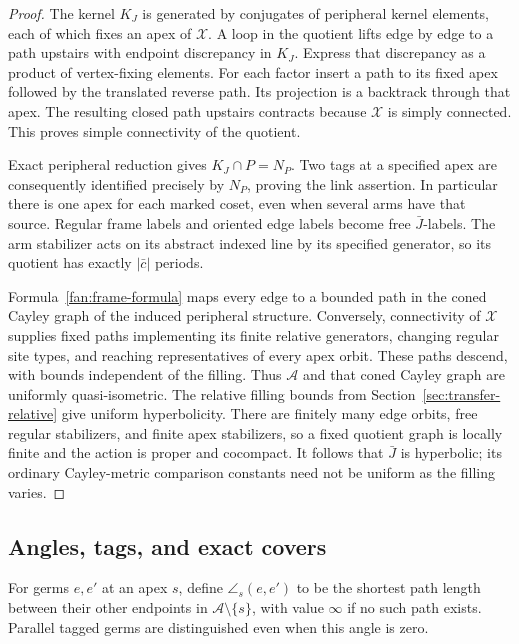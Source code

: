 \begin{proof}
The kernel $K_J$ is generated by conjugates of peripheral kernel
elements, each of which fixes an apex of $\mathcal X$.  A loop in the
quotient lifts edge by edge to a path upstairs with endpoint discrepancy
in $K_J$.  Express that discrepancy as a product of vertex-fixing
elements.  For each factor insert a path to its fixed apex followed by
the translated reverse path.  Its projection is a backtrack through
that apex.  The resulting closed path upstairs contracts because
$\mathcal X$ is simply connected.  This proves simple connectivity
of the quotient.

Exact peripheral reduction gives
$K_J\cap P=N_P$.  Two tags at a specified apex are consequently
identified precisely by $N_P$, proving the link assertion.  In
particular there is one apex for each marked coset, even when several
arms have that source.  Regular frame labels and oriented edge labels
become free $\bar J$-labels.  The arm stabilizer acts on its abstract
indexed line by its specified generator, so its quotient has exactly
$|\bar c|$ periods.

Formula~\eqref{fan:frame-formula} maps every edge to a bounded path in
the coned Cayley graph of the induced peripheral structure.  Conversely,
connectivity of $\mathcal X$ supplies fixed paths implementing its
finite relative generators, changing regular site types, and reaching
representatives of every apex orbit.  These paths descend, with bounds
independent of the filling.  Thus $\mathcal A$ and that coned Cayley
graph are uniformly quasi-isometric.  The relative filling bounds
from Section~\ref{sec:transfer-relative} give uniform hyperbolicity.  There
are finitely many edge orbits, free regular stabilizers, and finite
apex stabilizers, so a fixed quotient graph is locally finite and the
action is proper and cocompact.  It follows that $\bar J$ is hyperbolic;
its ordinary Cayley-metric comparison constants need not be uniform
as the filling varies.
\end{proof}

\subsection{Angles, tags, and exact covers}

For germs $e,e'$ at an apex $s$, define $\angle_s(e,e')$ to be the
shortest path length between their other endpoints in
$\mathcal A\setminus\{s\}$, with value $\infty$ if no such path exists.
Parallel tagged germs are distinguished even when this angle is zero.

